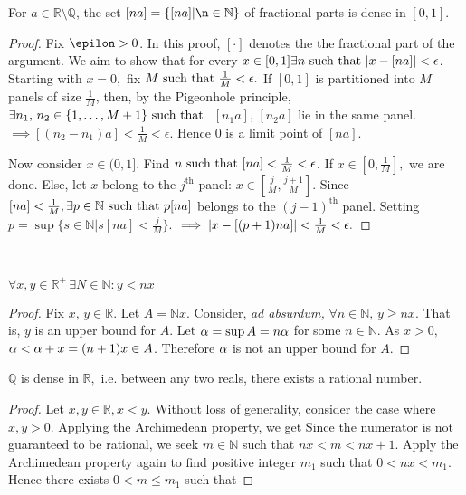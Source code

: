 \begin{theorem}
    For $a\in\mathbb{R}\setminus\mathbb{Q}$, the set $[na]=\left\{[na]|\n\in\mathbb{N}\right\}$ of fractional parts is dense in $[0,1]$.
\end{theorem}
\begin{proof}
    Fix $\epilon>0$. In this proof, $[\cdot]$ denotes the the fractional part of the argument. We aim to show that for every $x\in[0,1]\exists n\text{ such that } \abs{x-[na]}<\epsilon$. Starting with $x=0,$ fix $M\text{ such that }\frac{1}{M}<\epsilon.$ If $[0,1]$ is partitioned into $M$ panels of size $\frac{1}{M}$, then, by the Pigeonhole principle, $\exists n_1,\,n_2\in\{1,\dotsc,M+1\}\text{ such that }$ $[n_1a],\,[n_2a]$ lie in the same panel. $\implies [(n_2-n_1)a]<\frac{1}{M}<\epsilon.$ Hence $0$ is a limit point of $[na]$.
    
    Now consider $x\in(0,1]$. Find $n\text{ such that }[na]<\frac{1}{M}<\epsilon$. If $x\in[0,\frac{1}{M}],$ we are done. Else, let $x$ belong to the $j^\mathrm{th}$ panel: $x\in[\frac{j}{M},\frac{j+1}{M}]$. Since $[na]<\frac{1}{M},\exists p\in\mathbb{N}\text{ such that } p[na]$ belongs to the $(j-1)^\mathrm{th}$ panel. Setting $p=\sup\{s\in\mathbb{N}|s[na]<\frac{j}{M}\}$. $\implies \abs{x - [(p+1)na]}<\frac{1}{M}<\epsilon.$
\end{proof}

\\

\begin{theorem}
   $\forall x,y\in\mathbb{R}^+\,\exists N\in\mathbb{N}:y<nx$ 
\end{theorem}
\begin{proof}
   Fix $x,\,y\in\mathbb{R}$. Let $A=\mathbb{N}x$. Consider, \textit{ad absurdum,} $\forall n\in\mathbb{N},\,y\geq nx.$ That is, $y$ is an upper bound for $A.$ Let $\alpha=\sup{A}=n\alpha$ for some $n\in\mathbb{N}.$ As $x>0,$ $\alpha<\alpha+x=(n+1)x\in A$. Therefore $\alpha$ is not an upper bound for $A.$
\end{proof}

\begin{theorem}
   $\mathbb{Q}$ is dense in $\mathbb{R},$ i.e. between any two reals, there exists a rational number.
\end{theorem}
\begin{proof}
   Let $x,y\in\mathbb{R},x<y.$ Without loss of generality, consider the case where $x,y>0.$ Applying the Archimedean property, we get
   Since the numerator is not guaranteed to be rational, we seek $m\in\mathbb{N}$ such that $nx<m<nx+1$. Apply the Archimedean property again to find positive integer $m_1$ such that $0<nx<m_1.$ Hence there exists $0<m\leq m_1$ such that
\end{proof}

